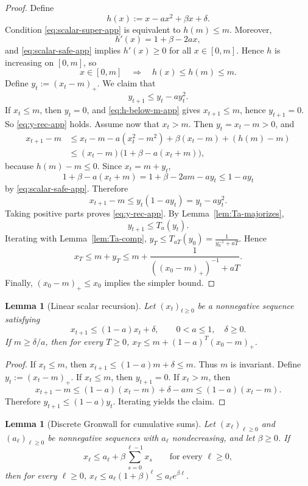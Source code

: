 \documentclass{article}
\newtheorem{lemma}[theorem]{Lemma}
\theoremstyle{definition}
\begin{document}
\begin{proof}
Define
\[
h(x):=x-a x^2+\beta x+\delta.
\]
Condition \eqref{eq:scalar-super-app} is equivalent to $h(m)\le m$. Moreover,
\[
h'(x)=1+\beta-2ax,
\]
and \eqref{eq:scalar-safe-app} implies $h'(x)\ge 0$ for all $x\in[0,m]$.
Hence $h$ is increasing on $[0,m]$, so
\begin{equation}
x\in[0,m]\quad\Longrightarrow\quad h(x)\le h(m)\le m.
\label{eq:h-below-m-app}\end{equation}
Define $
y_t:=(x_t-m)_+$.
We claim that
\begin{equation}
y_{t+1}\le y_t-a y_t^2.
\label{eq:y-rec-app}\end{equation}
If $x_t\le m$, then $y_t=0$, and \eqref{eq:h-below-m-app} gives
$x_{t+1}\le m$, hence $y_{t+1}=0$. So \eqref{eq:y-rec-app} holds.
Assume now that $x_t>m$. Then $y_t=x_t-m>0$, and
\begin{align*}
x_{t+1}-m
&\le
x_t-m-a(x_t^2-m^2)+\beta(x_t-m)+(h(m)-m)\\
&\le
(x_t-m)\bigl(1+\beta-a(x_t+m)\bigr),
\end{align*}
because $h(m)-m\le 0$. Since $x_t=m+y_t$,
\[
1+\beta-a(x_t+m)
=
1+\beta-2am-a y_t
\le
1-a y_t
\]
by \eqref{eq:scalar-safe-app}. Therefore
\[
x_{t+1}-m\le y_t(1-a y_t)=y_t-a y_t^2.
\]
Taking positive parts proves \eqref{eq:y-rec-app}. By
Lemma~\ref{lem:Ta-majorizes},
\[
y_{t+1}\le T_a(y_t).
\]
Iterating with Lemma~\ref{lem:Ta-comp}, $
y_T\le T_{aT}(y_0)=\frac{1}{y_0^{-1}+aT}$.
Hence
\[
x_T\le m+y_T\le m+\frac{1}{((x_0-m)_+)^{-1}+aT}.
\]
Finally, $(x_0-m)_+\le x_0$ implies the simpler bound.
\end{proof}

\begin{lemma}[Linear scalar recursion]
\label{lem:lin-scalar}
Let $(x_t)_{t\ge 0}$ be a nonnegative sequence satisfying
\[
x_{t+1}\le (1-a)x_t+\delta,
\qquad
0<a\le 1,\quad \delta\ge 0.\]
If $m\ge \delta/a$, then for every $T\ge 0$, $
x_T\le m+(1-a)^T (x_0-m)_+$.
\end{lemma}

\begin{proof}
If $x_t\le m$, then $
x_{t+1}\le (1-a)m+\delta\le m$.
Thus $m$ is invariant. Define $y_t:=(x_t-m)_+$. If $x_t\le m$, then
$y_{t+1}=0$. If $x_t>m$, then
\[
x_{t+1}-m\le (1-a)(x_t-m)+\delta-am\le (1-a)(x_t-m).
\]
Therefore $y_{t+1}\le (1-a)y_t$. Iterating yields the claim.
\end{proof}


\begin{lemma}[Discrete Gronwall for cumulative sums]
\label{lem:cum-gronwall}
Let $(x_\ell)_{\ell\ge 0}$ and $(a_\ell)_{\ell\ge 0}$ be nonnegative sequences with $a_\ell$ nondecreasing, and let $\beta\ge 0$. If
\[
x_\ell\le a_\ell+\beta\sum_{s=0}^{\ell-1}x_s
\qquad\text{for every }\ell\ge 0,
\]
then for every $\ell\ge 0$, $
x_\ell\le a_\ell(1+\beta)^\ell\le a_\ell e^{\beta\ell}$.
\end{lemma}
\end{document}
